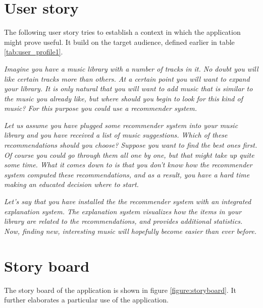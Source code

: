 
\section{User story}

The following user story tries to establish a context in which the application might prove useful. It build on the target audience, defined earlier in table \ref{tab:user_profile1}.

\textit{Imagine you have a music library with a number of tracks in it. No doubt you will like certain tracks more than others. At a certain point you will want to expand your library. It is only natural that you will want to add music that is similar to the music you already like, but where should you begin to look for this kind of music? For this purpose you could use a recommender system.}

\textit{Let us assume you have plugged some recommender system into your music library and you have received a list of music suggestions. Which of these recommendations should you choose? Suppose you want to find the best ones first. Of course you could go through them all one by one, but that might take up quite some time. What it comes down to is that you don't know how the recommender system computed these recommendations, and as a result, you have a hard time making an educated decision where to start.}

\textit{Let's say that you have installed the the recommender system with an integrated explanation system. The explanation system visualizes how the items in your library are related to the recommendations, and provides additional statistics. Now, finding new, interesting music will hopefully become easier than ever before.}


\section{Story board}

The story board of the application is shown in figure \ref{figure:storyboard}. It further elaborates a particular use of the application.

